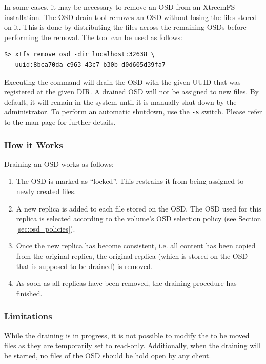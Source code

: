 \documentclass[a4paper,10pt]{book}
\begin{document}
In some cases, it may be necessary to remove an OSD from an XtreemFS installation. The OSD drain tool removes an OSD without losing the files stored on it. This is done by distributing the files across the remaining OSDs before performing the removal. The tool can be used as follows:

\begin{verbatim}
$> xtfs_remove_osd -dir localhost:32638 \
   uuid:8bca70da-c963-43c7-b30b-d0d605d39fa7
\end{verbatim}

Executing the command will drain the OSD with the given UUID that was registered at the given DIR. A drained OSD will not be assigned to new files. By default, it will remain in the system until it is manually shut down by the administrator. To perform an automatic shutdown, use the \texttt{-s} switch. Please refer to the man page for further details.

\subsubsection{How it Works}

Draining an OSD works as follows:
\begin{enumerate}
 \item The OSD is marked as ``locked''. This restrains it from being assigned to newly created files.
 \item A new replica is added to each file stored on the OSD. The OSD used for this replica is selected according to the volume's OSD selection policy (see Section \ref{sec:osd_policies}).
 \item Once the new replica has become consistent, i.e. all content has been copied from the original replica, the original replica (which is stored on the OSD that is supposed to be drained) is removed.
 \item As soon as all replicas have been removed, the draining procedure has finished. 
\end{enumerate}

\subsubsection{Limitations}

While the draining is in progress, it is not possible to modify the to be moved files as they are temporarily set to read-only. Additionally, when the draining will be started, no files of the OSD should be hold open by any client.
\end{document}
